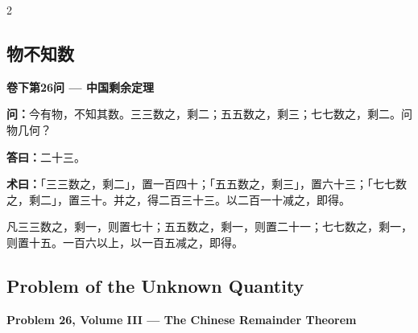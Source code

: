 \documentclass[11pt,a4paper]{article}
\begin{document}
\newpage

\begin{paracol}{2}

\begin{tcolorbox}[colback=crtgold!8,colframe=crtgold,boxrule=1.5pt,
  left=10pt,right=10pt,top=8pt,bottom=8pt,arc=3mm]
\section*{\color{crtgold}物不知数}

\begin{center}
\textbf{\large 卷下第26问 — 中国剩余定理}
\end{center}

\vspace{0.2cm}

\textbf{问：}今有物，不知其数。三三数之，剩二；五五数之，剩三；七七数之，剩二。问物几何？

\vspace{0.2cm}

\textbf{答曰：}二十三。

\vspace{0.2cm}

\textbf{术曰：}「三三数之，剩二」，置一百四十；「五五数之，剩三」，置六十三；「七七数之，剩二」，置三十。并之，得二百三十三。以二百一十减之，即得。

凡三三数之，剩一，则置七十；五五数之，剩一，则置二十一；七七数之，剩一，则置十五。一百六以上，以一百五减之，即得。
\end{tcolorbox}

\switchcolumn

\begin{tcolorbox}[colback=crtgold!8,colframe=crtgold,boxrule=1.5pt,
  left=10pt,right=10pt,top=8pt,bottom=8pt,arc=3mm]
\section*{\color{crtgold}Problem of the Unknown Quantity}

\begin{center}
\textbf{\large Problem 26, Volume III — The Chinese Remainder Theorem}
\end{center}


\end{tcolorbox}
\end{paracol}
\end{document}
